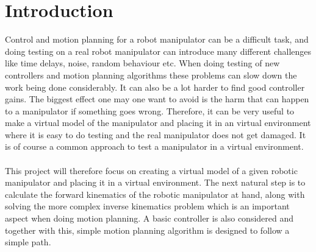 \chapter{Introduction}

Control and motion planning for a robot manipulator can be a difficult task, and doing testing on a real robot manipulator can introduce many different challenges like time delays, noise, random behaviour etc. When doing testing of new controllers and motion planning algorithms these problems can slow down the work being done considerably. It can also be a lot harder to find good controller gains. The biggest effect one may one want to avoid is the harm that can happen to a manipulator if something goes wrong. Therefore, it can be very useful to make a virtual model of the manipulator and placing it in an virtual environment where it is easy to do testing and the real manipulator does not get damaged. It is of course a common approach to test a manipulator in a virtual environment.\\\\
This project will therefore focus on creating a virtual model of a given robotic manipulator and placing it in a virtual environment. The next natural step is to calculate the forward kinematics of the robotic manipulator at hand, along with solving the more complex inverse kinematics problem which is an important aspect when doing motion planning. A basic controller is also considered and together with this, simple motion planning algorithm is designed to follow a simple path.
    





